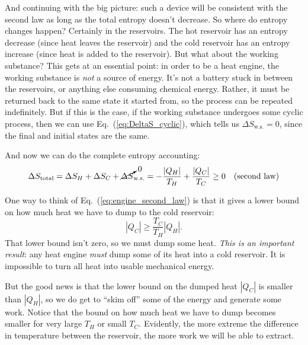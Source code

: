 And continuing with the big picture: such a device will be consistent
with the second law as long as the total entropy doesn't decrease.  So
where do entropy changes happen?  Certainly in the reservoirs.  The
hot reservoir has an entropy decrease (since heat leaves the
reservoir) and the cold reservoir has an entropy increase 
(since heat is added to the reservoir).  But what about the 
working substance?  This gets at an
essential point: in order to be a heat engine, the working substance is {\it
  not} a source of energy.  It's not a battery stuck in between the
reservoirs, or anything else consuming chemical energy.  Rather, it
must be returned back to the same state it started from, so the
process can be repeated indefinitely.  But if this is the case, if the
working substance undergoes some cyclic process, then we
can use Eq.~(\ref{eq:DeltaS_cyclic}), which tells us $\Delta
S_\text{w.s.}=0$, since the final and initial states are the same.

And now we can do the complete entropy accounting:
\begin{equation}
  \Delta S_\text{total}= \Delta S_H + \Delta S_C + 
  \cancelto{0}{\Delta S}_\text{w.s.}
  = -\frac{|Q_H|}{T_H}+ \frac{|Q_C|}{T_C}  \geq 0 \quad\text{(second
    law)}
\label{eq:engine_second_law}
\end{equation}

One way to think of Eq.~(\ref{eq:engine_second_law}) is that it gives
a lower bound on how much heat we have to dump to the cold reservoir:
\begin{equation}
|Q_C| \geq \frac{T_C}{T_H}|Q_H|.
\end{equation}
That lower bound isn't zero, so we must dump some heat.
{\it This is an important result}:  any heat engine {\it must}
dump some of its heat into a cold reservoir.  It is impossible
to turn all heat into usable mechanical energy. 

But the good news is that the lower bound on the dumped heat $|Q_C|$
is smaller than $|Q_H|$, so we do get to ``skim off'' some of the
energy and generate some work.  Notice that the bound on how much heat
we have to dump becomes smaller for very large $T_H$ or small $T_C$.
Evidently, the more extreme the difference in temperature between the
reservoir, the more work we will be able to extract.

